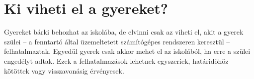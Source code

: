 \section{Ki viheti el a gyereket?}

Gyereket bárki behozhat az iskolába, de elvinni csak az viheti el, akit a gyerek szülei -- a fenntartó által üzemeltetett számítógépes rendszeren keresztül -- felhatalmaztak. Egyedül gyerek csak akkor mehet el az iskolából, ha erre a szülei engedélyt adtak. Ezek a felhatalmazások lehetnek egyszeriek, határidőhöz kötöttek vagy visszavonásig érvényesek.

